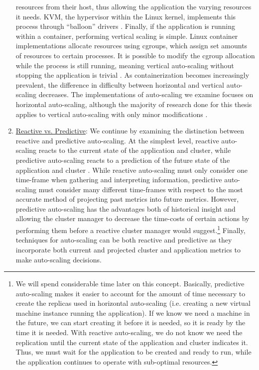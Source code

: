\begin{enumerate}
    resources from their host, thus allowing the application the varying
    resources it needs. KVM, the hypervisor within the Linux kernel, implements
    this process through ``balloon'' drivers \cite{kvm-automatic-ballooning}.
    Finally, if the application is running within a container, performing
    vertical scaling is simple. Linux container implementations allocate
    resources using cgroups, which assign set amounts of resources to certain
    processes. It is possible to modify the cgroup allocation while the process
    is still running, meaning vertical auto-scaling without stopping the
    application is trivial \cite{docker-up-and-running}.
    As containerization becomes increasingly prevalent, the difference in
    difficulty between horizontal and vertical auto-scaling decreases.
    The implementations of auto-scaling we examine focuses on horizontal
    auto-scaling, although the majority of research done for this thesis applies
    to vertical auto-scaling with only minor modifications
    \cite{auto-scaling-techniques-for-elastic-applications-in-cloud-environments}.

  \item \underline{Reactive vs. Predictive}: We continue by
    examining the distinction between reactive and predictive
    auto-scaling. At the simplest level, reactive auto-scaling reacts to
    the current state of the application and cluster, while predictive
    auto-scaling reacts to a prediction of the future state of the application and cluster
    \cite{auto-scaling-techniques-for-elastic-applications-in-cloud-environments}.
    While reactive auto-scaling must only consider one
    time-frame when gathering and interpreting information, predictive
    auto-scaling must consider many different time-frames with respect to the
    most accurate method of projecting past metrics into future metrics. However,
    predictive auto-scaling has the advantages both of historical insight and allowing
    the cluster manager to decrease the time-costs of certain actions by performing
    them before a reactive cluster manager would suggest.\footnote{We will spend
    considerable time later on this concept. Basically, predictive auto-scaling
    makes it easier to account for the amount of time necessary to create the
    replicas used in horizontal auto-scaling (i.e. creating
    a new virtual machine instance running
    the application). If we know we need a machine in the future, we can start
    creating it before it is needed, so it is ready by the time it is needed. With reactive
    auto-scaling, we do not know we need the replication until the current state of
    the application and cluster indicates it. Thus, we must wait for the
    application to be created and ready to run,
    while the application continues to operate with sub-optimal resources.}
    Finally, techniques for auto-scaling can be both reactive and predictive as
    they incorporate both current and projected cluster and application metrics
    to make auto-scaling decisions.
\end{enumerate}

